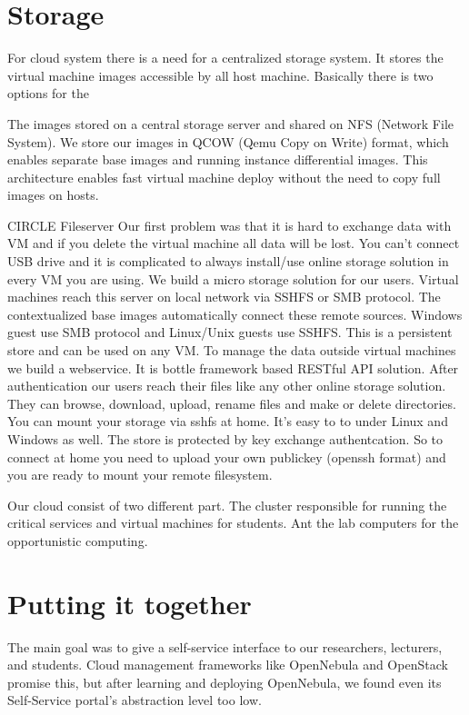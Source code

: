 \documentclass{llncs}
\begin{document}
\section{Storage}
For cloud system there is a need for a centralized storage system. It stores the virtual machine images accessible by all host machine. Basically there is two options for the 

The images stored on a central storage server and shared on NFS (Network File System). We store our images in QCOW (Qemu Copy on Write) format, which enables  separate base images and running instance differential images. This architecture enables fast virtual machine deploy without the need to copy full images on hosts.
	 	 	
CIRCLE Fileserver
Our first problem was that it is hard to exchange data with VM and if you delete the virtual machine all data will be lost. You can't connect USB drive and it is complicated to always install/use online storage solution in every VM you are using. We build a micro storage solution for our users. Virtual machines reach this server on local network via SSHFS or SMB protocol. The contextualized base images automatically connect these remote sources. Windows guest use SMB protocol and Linux/Unix guests use SSHFS. This is a persistent store and can be used on any VM. To manage the data outside virtual machines we build a webservice. It is bottle framework based RESTful API solution. After authentication our users reach their files like any other online storage solution. They can browse, download, upload, rename files and make or delete directories. You can mount your storage via sshfs at home. It's easy to to under Linux and Windows as well. The store is protected by key exchange authentcation. So to connect at home you need to upload your own publickey (openssh format) and you are ready to mount your remote filesystem.

Our cloud consist of two different part. The cluster responsible for running the critical services and virtual machines for students. Ant the lab computers for the opportunistic computing.


\section{Putting it together}
The main goal was to give a self-service interface to our researchers, lecturers, and students.
Cloud management frameworks like OpenNebula and OpenStack promise this, but after learning and deploying OpenNebula, we found even its Self-Service portal's abstraction level too low.
\end{document}

